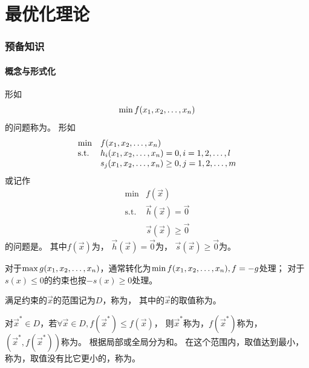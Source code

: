 \part{最优化理论}
\section{预备知识}
\subsection{概念与形式化}

\newcommand{\SubjectTo}{\mathrm{s.t.}}

\begin{definition}[极值问题及不同约束及记号]
    形如
    \[
        \min f(\VectorComma{x}{n})
    \]
    的问题称为。
    形如
    \[
        \begin{array}{ll}
            \min & f(\VectorComma{x}{n}) \\
            \SubjectTo & h_i(\VectorComma{x}{n})=0,i=1,2,\dots,l \\
            & s_j(\VectorComma{x}{n})\geq 0,j=1,2,\dots,m \\
        \end{array}
    \]
    或记作
    \[
        \begin{array}{ll}
            \min & f(\vec{x}) \\
            \SubjectTo & \vec{h}(\vec{x})=\vec{0}\\
            & \vec{s}(\vec{x})\geq \vec{0}
        \end{array}
    \]
    的问题是。
    其中$f(\vec{x})$为，
    $\vec{h}(\vec{x})=\vec{0}$为，
    $\vec{s}(\vec{x})\geq\vec{0}$为。
\end{definition}

对于$\max g(\VectorComma{x}{n})$，通常转化为$\min f(\VectorComma{x}{n}),f=-g$处理；
对于$s(x)\leq 0$的约束也按$-s(x)\geq 0$处理。

\begin{definition}
    满足约束的$\vec{x}$的范围记为$D$，称为，
    其中的$\vec{x}$的取值称为。
\end{definition}

\begin{definition}[极小点及其分类]
    对$\vec{x}^*\in D$，若$\forall \vec{x}\in D, f(\vec{x}^*)\leq f(\vec{x})$，
    则$\vec{x}^*$称为，$f(\vec{x}^*)$称为，
    $(\vec{x}^*,f(\vec{x}^*))$称为。
    根据局部或全局分为和。
    在这个范围内，取值达到最小，称为，取值没有比它更小的，称为。
\end{definition}

